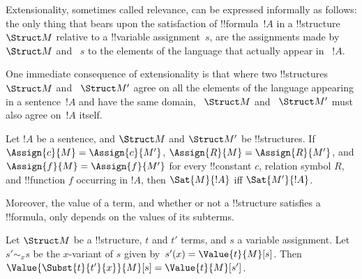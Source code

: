\documentclass[../../include/open-logic-section]{subfiles}
\begin{document}


\begin{explain}
Extensionality, sometimes called relevance, can be expressed
informally as follows: the only thing that bears upon the satisfaction
of !!{formula}~$!A$ in a !!{structure}~$\Struct M$ relative to a
!!{variable} assignment~$s$, are the assignments made by ~$\Struct M$
and ~$s$ to the elements of the language that actually appear in
~$!A$.

One immediate consequence of extensionality is that where two
!!{structure}s~$\Struct M$ and ~$\Struct M'$ agree on all the elements
of the language appearing in a sentence~$!A$ and have the same domain,
~$\Struct M$ and ~$\Struct M'$ must also agree on~$!A$ itself.
\end{explain}

\begin{prop}[Extensionality]
Let $!A$ be a sentence, and $\Struct M$ and $\Struct M'$ be !!{structure}s. 
If $\Assign{c}{M} = \Assign{c}{M'}$, $\Assign{R}{M}=\Assign{R}{M'}$, and 
$\Assign{f}{M} = \Assign{f}{M'}$ for every !!{constant} $c$, relation 
symbol $R$, and !!{function} $f$ occurring in $!A$, then $\Sat{M}{!A}$ 
iff $\Sat{M'}{!A}$.
\end{prop}

Moreover, the value of a term, and whether or not a !!{structure}
satisfies a !!{formula}, only depends on the values of its subterms.

\begin{prop}
Let $\Struct M$ be a !!{structure}, $t$ and $t'$ terms, and $s$ a
variable assignment. Let $s' \sim_x s$ be the $x$-variant of $s$ given
by~$s'(x) = \Value{t}{M}[s]$. Then $\Value{\Subst{t}{t'}{x}}{M}[s] =
\Value{t}{M}[s']$.
\end{prop}
\end{document}

